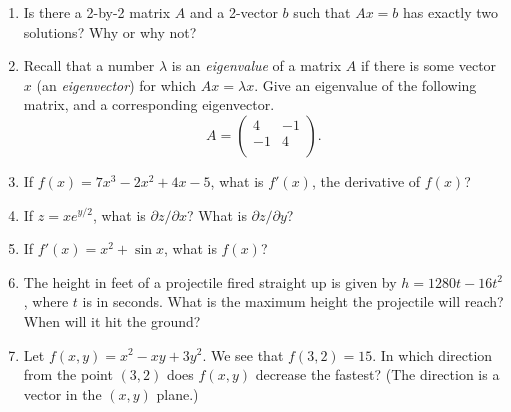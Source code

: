 \documentclass[11pt]{article}
\begin{document}
\begin{enumerate}
\item
Is there a 2-by-2 matrix $A$ and a 2-vector $b$ such that $Ax=b$ has
exactly two solutions?  Why or why not?

\item
Recall that a number $\lambda$ is an {\em eigenvalue} 
of a matrix $A$ if there is some vector $x$ 
(an {\em eigenvector}) for which $Ax = \lambda x$.
Give an eigenvalue of the following matrix, and a corresponding eigenvector.
$$ A = \left(
\begin{array}{cc}
4 & -1 \\ 	
-1 & 4 \\
\end{array} 
\right). $$

\item
If $f(x)=7x^3-2x^2+4x-5$, what is $f'(x)$, the derivative of $f(x)$?

\item
If $z = xe^{y/2}$, what is $\partial z / \partial x$?
What is $\partial z / \partial y$?

\item
If $f'(x) = x^2 + \sin x$, what is $f(x)$?

\item
The height in feet of a projectile fired straight up is
given by $h=1280t-16t^2$, where $t$ is in seconds.
What is the maximum height the projectile will reach? 
When will it hit the ground?

\item
Let $f(x,y) = x^2 - xy + 3y^2$. We see that $f(3,2) = 15$. 
In which direction from the point $(3,2)$ does $f(x,y)$ decrease
the fastest? (The direction is a vector in the $(x,y)$ plane.)

\end{enumerate}
\end{document}
